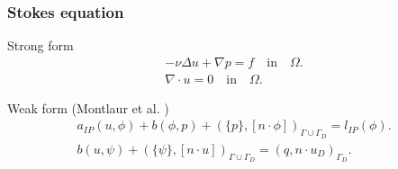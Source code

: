 \documentclass{beamer}
\begin{document}
\begin{frame}
\frametitle{Stokes equation}

\begin{block}{Strong form}
\begin{equation} \label{stokes_strong_form_ch3}
\begin{split}
-\nu \Delta u + \nabla p = f \quad \textrm{in} \quad \Omega \textrm{.}\\
\nabla \cdot u = 0 \quad \textrm{in} \quad \Omega \textrm{.}
\end{split}
\end{equation}
\end{block}

\begin{block}{Weak form (Montlaur et al. \cite{Montlaur2})}
\begin{equation}\label{stokes_weak_ch3}
\begin{split}
a_{IP}(u,\phi) + b(\phi,p) + (\{p\},[n\cdot \phi])_{\Gamma \cup \Gamma_D} = l_{IP}(\phi) \textrm{.}\\
b(u,\psi) + (\{\psi\},[n\cdot u])_{\Gamma \cup \Gamma_D} = (q,n\cdot u_D)_{\Gamma_D} \textrm{.}
\end{split}
\end{equation}
\end{block}

\end{frame}

\end{document}
